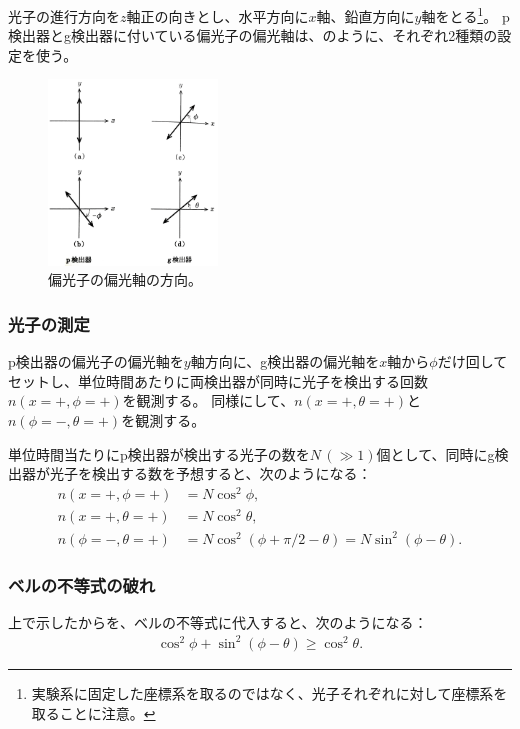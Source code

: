 \documentclass[10pt,b5paper,papersize,dvipdfmx]{jsbook}
\begin{document}
光子の進行方向を$z$軸正の向きとし、水平方向に$x$軸、鉛直方向に$y$軸をとる\footnote{
  実験系に固定した座標系を取るのではなく、光子それぞれに対して座標系を取ることに注意。
}。
p検出器とg検出器に付いている偏光子の偏光軸は、のように、それぞれ2種類の設定を使う。

\begin{figure}[ht]
  \centering
  \includegraphics[width=45mm]{nkym/fig/henkou-jiku.jpeg}
  \caption{偏光子の偏光軸の方向。} %
  \label{fig:henkou-jiku}
\end{figure}

%
\subsubsection{光子の測定} %

p検出器の偏光子の偏光軸を$y$軸方向に、g検出器の偏光軸を$x$軸から$\phi$だけ回してセットし、単位時間あたりに両検出器が同時に光子を検出する回数$n(x=+,\phi=+)$を観測する。
同様にして、$n(x=+,\theta=+)$と$n(\phi=-,\theta=+)$を観測する。\par
単位時間当たりにp検出器が検出する光子の数を$N \,(\gg 1)$個として、同時にg検出器が光子を検出する数を予想すると、次のようになる：
\begin{align}
  \label{eq:photon-1} n(x=+,\phi=+)      &= N \cos^2\phi, \\
  \label{eq:photon-2} n(x=+,\theta=+)    &= N \cos^2\theta, \\
  \label{eq:photon-3} n(\phi=-,\theta=+) &= N \cos^2(\phi + \pi/2 - \theta) = N \sin^2(\phi - \theta).
\end{align}

%
\subsubsection{ベルの不等式の破れ} %

上で示したからを、ベルの不等式に代入すると、次のようになる：
\begin{align*}
  \cos^2\phi + \sin^2(\phi - \theta) \ge \cos^2\theta.
\end{align*}
\end{document}

